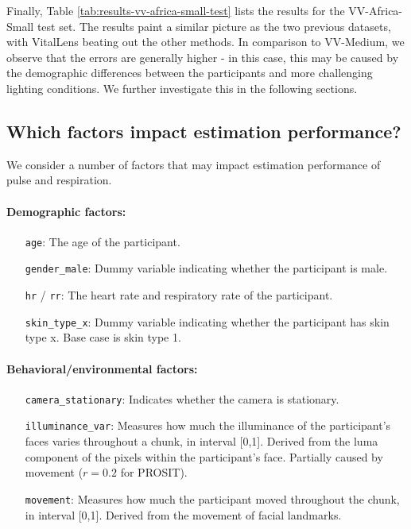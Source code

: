 \documentclass{article}
\begin{document}
Finally, Table \ref{tab:results-vv-africa-small-test} lists the results for the VV-Africa-Small test set.
The results paint a similar picture as the two previous datasets, with VitalLens beating out the other methods.
In comparison to VV-Medium, we observe that the errors are generally higher - in this case, this may be caused by the demographic differences between the participants and more challenging lighting conditions.
We further investigate this in the following sections.

\subsection{Which factors impact estimation performance?}

We consider a number of factors that may impact estimation performance of pulse and respiration.

\paragraph{Demographic factors:}

\begin{enumerate}[align=left]
	\item[\texttt{age}:] The age of the participant.
	\item[\texttt{gender\_male}:] Dummy variable indicating whether the participant is male.
	\item[\texttt{hr} / \texttt{rr}:] The heart rate and respiratory rate of the participant.
	\item[\texttt{skin\_type\_x}:] Dummy variable indicating whether the participant has skin type x. Base case is skin type 1.
\end{enumerate}

\paragraph{Behavioral/environmental factors:}

\begin{enumerate}[align=left]
	\item[\texttt{camera\_stationary}:] Indicates whether the camera is stationary.
	\item[\texttt{illuminance\_var}:] Measures how much the illuminance of the participant's faces varies throughout a chunk, in interval [0,1]. Derived from the luma component of the pixels within the participant's face. Partially caused by movement ($r = 0.2$ for PROSIT).
	\item[\texttt{movement}:] Measures how much the participant moved throughout the chunk, in interval [0,1]. Derived from the movement of facial landmarks.
\end{enumerate}
\end{document}
